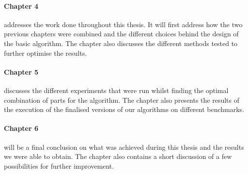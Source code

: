 \paragraph{Chapter 4}addresses the work done throughout this thesis. It will first address how the two previous chapters were combined and the different choices behind the design of the basic algorithm. The chapter also discusses the different methods tested to further optimise the results.

\paragraph{Chapter 5}discusses the different experiments that were run whilst finding the optimal combination of parts for the algorithm. The chapter also presents the results of the execution of the finalised versions of our algorithms on different benchmarks.

\paragraph{Chapter 6}will be a final conclusion on what was achieved during this thesis and the results we were able to obtain. The chapter also contains a short discussion of a few possibilities for further improvement.









